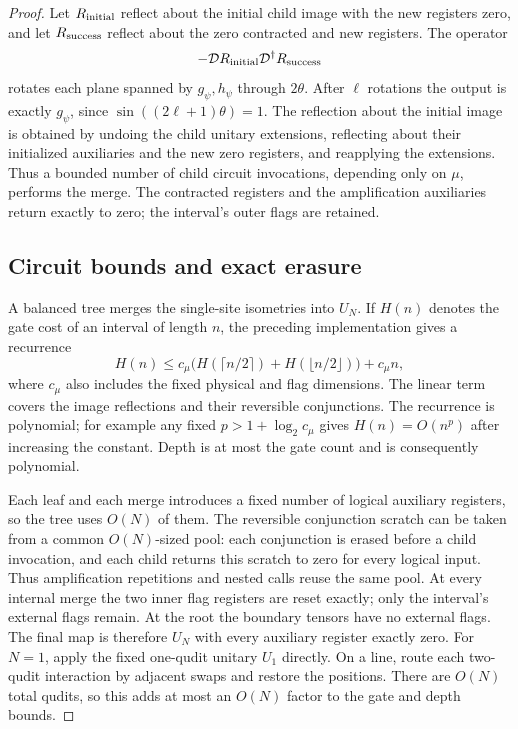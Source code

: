 \documentclass[11pt]{article}
\begin{document}
\begin{proof}
Let $R_{\rm initial}$ reflect about the initial child image with
the new registers zero, and let $R_{\rm success}$ reflect about
the zero contracted and new registers. The operator
\[
 -\mathcal D R_{\rm initial}\mathcal D^\dagger R_{\rm success}
\]
rotates each plane spanned by $g_\psi,h_\psi$ through $2\theta$.
After $\ell$ rotations the output is exactly $g_\psi$, since
$\sin((2\ell+1)\theta)=1$. The reflection about the initial image
is obtained by undoing the child unitary extensions, reflecting
about their initialized auxiliaries and the new zero registers,
and reapplying the extensions. Thus a bounded number of child
circuit invocations, depending only on $\mu$, performs the merge.
The contracted registers and the amplification auxiliaries return
exactly to zero; the interval's outer flags are retained.

\subsection*{Circuit bounds and exact erasure}

A balanced tree merges the single-site isometries into $U_N$.
If $H(n)$ denotes the gate cost of an interval of length $n$,
the preceding implementation gives a recurrence
\[
 H(n)\leq c_\mu\bigl(H(\lceil n/2\rceil)+H(\lfloor n/2\rfloor)\bigr)
            +c_\mu n,
\]
where $c_\mu$ also includes the fixed physical and flag dimensions.
The linear term covers the image reflections and their reversible
conjunctions. The recurrence is polynomial; for example any fixed
$p>1+\log_2c_\mu$ gives $H(n)=O(n^p)$ after increasing the constant.
Depth is at most the gate count and is consequently polynomial.

Each leaf and each merge introduces a fixed number of logical
auxiliary registers, so the tree uses $O(N)$ of them. The reversible
conjunction scratch can be taken from a common $O(N)$-sized pool:
each conjunction is erased before a child invocation, and each
child returns this scratch to zero for every logical input. Thus
amplification repetitions and nested calls reuse the same pool.
At every internal merge the two inner flag registers are reset
exactly; only the interval's external flags remain. At the root
the boundary tensors have no external flags. The final map is
therefore $U_N$ with every auxiliary register exactly zero.
For $N=1$, apply the fixed one-qudit unitary $U_1$ directly.
On a line, route each two-qudit interaction by adjacent swaps and
restore the positions. There are $O(N)$ total qudits, so this adds
at most an $O(N)$ factor to the gate and depth bounds.
\end{proof}
\end{document}
